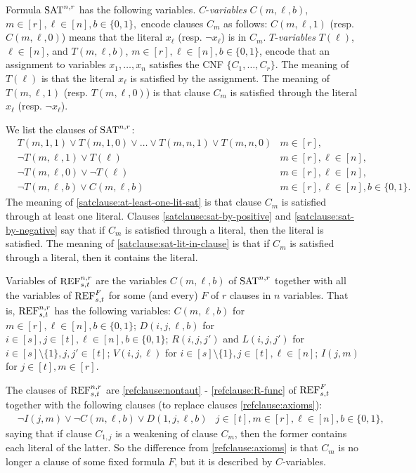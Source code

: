 Formula $\textnormal{SAT}^{n,r}$ has the following variables. $C$-\emph{variables} $C(m,\ell,b)$, $m \in [r], \ell \in [n], b \in \{0,1\},$ encode clauses $C_m$ as follows: $C(m,\ell,1)$ (resp. $C(m,\ell,0)$) means that the literal $x_\ell$ (resp. $\neg x_\ell$) is in $C_m$. 
$T$-\emph{variables} $T(\ell)$, $\ell \in [n]$, and $T(m,\ell,b)$, $m \in [r], \ell \in [n], b \in \{0,1\}$, encode that an assignment to variables $x_1,\ldots, x_n$ satisfies the CNF $\{C_1,\ldots, C_r\}$. The meaning of $T(\ell)$ is that the literal $x_\ell$ is satisfied by the assignment. The meaning of $T(m,\ell,1)$ (resp. $T(m,\ell,0)$) is that clause $C_m$ is satisfied through the literal $x_\ell$ (resp. $\neg x_\ell$).

We list the clauses of $\textnormal{SAT}^{n,r}$:
\begin{align}
\label{satclause:at-least-one-lit-sat} & T(m,1,1) \lor T(m,1,0) \lor \ldots \lor T(m,n,1) \lor T(m,n,0)& m \in [r],\\
\label{satclause:sat-by-positive} & \neg T(m,\ell,1) \lor T(\ell) & m \in [r], \ell \in [n],\\
\label{satclause:sat-by-negative} & \neg T(m,\ell,0) \lor \neg T(\ell) & m \in [r], \ell \in [n],\\
\label{satclause:sat-lit-in-clause} & \neg T(m,\ell,b) \lor C(m,\ell,b) & m \in [r], \ell \in [n], b \in \{0,1\}.
\end{align}
The meaning of \eqref{satclause:at-least-one-lit-sat} is that clause $C_m$ is satisfied through at least one literal.
Clauses \eqref{satclause:sat-by-positive} and \eqref{satclause:sat-by-negative} say that if $C_m$ is satisfied through a literal, then the literal is satisfied.
The meaning of \eqref{satclause:sat-lit-in-clause} is that if $C_m$ is satisfied through a literal, then it contains the literal. 

Variables of $\textnormal{REF}^{n,r}_{s,t}$ are the variables $C(m,\ell,b)$ of $\textnormal{SAT}^{n,r}$ together with all the variables of $\textnormal{REF}^F_{s,t}$ for some (and every) $F$ of $r$ clauses in $n$ variables. That is, $\textnormal{REF}^{n,r}_{s,t}$ has the following variables:
$C(m,\ell,b)$ for $m \in [r], \ell \in [n], b \in \{0,1\}$;
$D(i,j,\ell,b)$ for $i \in [s], j \in [t], \ell \in [n], b \in \{0,1\}$; 
$R(i,j,j')$ and $L(i,j,j')$ for $i \! \in \! [s] \! \setminus \! \{1\}, j,j' \in [t]$; $V(i,j,\ell)$ for $i \! \in \! [s] \! \setminus \! \{1\}, j \in [t], \ell \in [n]$; $I(j,m)$ for $j \in [t], m \in [r]$.

The clauses of $\textnormal{REF}^{n,r}_{s,t}$ are 
\eqref{refclause:nontaut} - \eqref{refclause:R-func} of  $\textnormal{REF}^F_{s,t}$ together with the following clauses (to replace clauses \eqref{refclause:axioms}): 
\begin{align}
\label{refclause-n-r:axioms}
& \neg I(j,m) \lor \neg C(m,\ell,b) \lor D(1,j,\ell,b) &  j \in [t], m \in [r], \ell \in [n], b \in \{0,1\},
\end{align}
saying that if clause $C_{1,j}$ is a weakening of clause $C_m$, then the former contains each literal of the latter. So the difference from \eqref{refclause:axioms} is that $C_m$ is no longer a clause of some fixed formula $F$, but it is described by $C$-variables.

